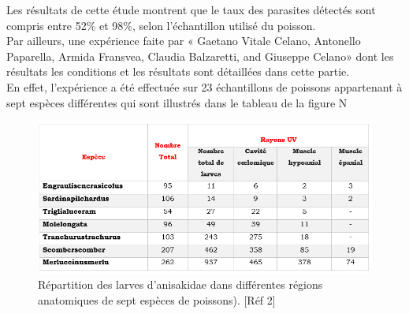 \documentclass[12pt,a4paper]{article}
\begin{document}
Les résultats de cette étude montrent que le taux des parasites détectés sont compris entre 52\% et 98\%, selon l’échantillon utilisé du poisson. \\
Par ailleurs, une expérience faite par « Gaetano Vitale Celano, Antonello Paparella, Armida Fransvea, Claudia Balzaretti, and Giuseppe Celano» dont les résultats les conditions et les résultats sont détaillées dans cette partie.\\
En effet, l’expérience a été effectuée sur 23 échantillons de poissons appartenant à sept espèces différentes qui sont illustrés dans le tableau de la figure N \\
\begin{figure}[!h]
   \center
   \includegraphics[scale=0.5]{Tableau01.png}
   \caption {Répartition des larves d'anisakidae dans différentes régions anatomiques de sept espèces de poissons). [Réf 2]}
\end{figure}
\end{document}
